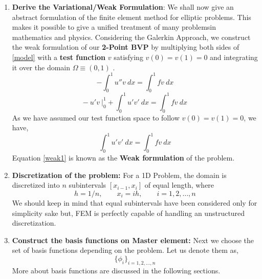\begin{enumerate}
	\item \textbf{Derive the Variational/Weak Formulation}:
	We shall now give an abstract formulation of the finite element method for elliptic problems. This makes it possible to give a unified treatment of many problemsin mathematics and physics. Considering the Galerkin Approach, we construct the weak formulation of our \textbf{2-Point BVP} by multiplying both sides of \ref{model} with a \textbf{test function} $v$ satisfying $v(0) = v(1) = 0$ and integrating it over the domain $\Omega \equiv (0,1)$ .
	\begin{equation}
	-\int_{0}^{1} u'' v\ dx = \int_{0} ^{1} fv \ dx
	\end{equation}
	\begin{equation}
	- \ u'v \ \Big|_0^1 + \int_{0}^{1} u'v' \ dx = \int_{0}^{1} f v \ dx
	\end{equation}
	As we have assumed our test function space to follow $v(0) = v(1) = 0$, we have,
	\begin{equation}
	\int_{0}^{1} u'v' \ dx = \int_{0}^{1} f v \ dx \label{weak1}
	\end{equation}
	Equation \ref{weak1} is known as the \textbf{Weak formulation} of the problem.
	
	\item \textbf{Discretization of the problem:} For a 1D Problem, the domain is discretized into $n$ subintervals $\left[x_{i-1}, x_i\right]$ of equal length, where 
	\begin{equation}
	h = 1/n, \qquad x_i = ih, \qquad i = 1,2, \dots, n
	\end{equation}
	We should keep in mind that equal subintervals have been considered only for simplicity sake but, FEM is perfectly capable of handling an unstructured discretization.
	\item \textbf{Construct the basis functions on Master element: } Next we choose the set of basis functions depending on the problem. Let us denote them as,
	\begin{equation}
	\{\phi_i \}_{i=1,2, \dots, n}
	\end{equation}
	More about basis functions are discussed in the following sections.
	

\end{enumerate}
